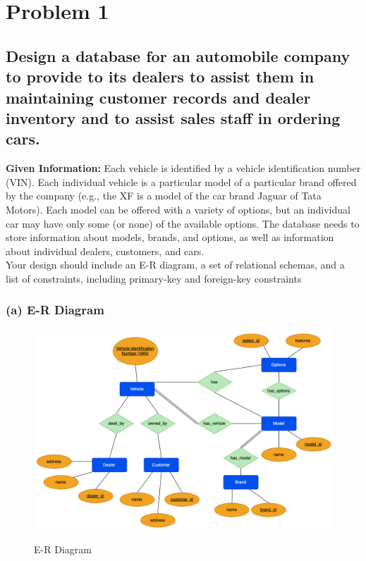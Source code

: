 \documentclass[12pt]{article}
\begin{document}
\begin{titlingpage}
\maketitle
\end{titlingpage}

\newpage

\section{Problem 1}

\subsection*{Design a database for an automobile company to provide to its dealers to assist them in maintaining customer records and dealer inventory and to assist sales staff in ordering cars.} 
\textbf{Given Information:} Each vehicle is identified by a vehicle identification number (VIN). Each individual vehicle is a particular model of a particular brand offered by the company (e.g., the XF is a model of the car brand Jaguar of Tata Motors). Each model can be offered with a variety of options, but an individual car may have only some (or none) of the available options. The database needs to store information about models, brands, and options, as well as information about individual dealers, customers, and cars. 
\\
Your design should include an E-R diagram, a set of relational schemas, and a 
list of constraints, including primary-key and foreign-key constraints

\subsubsection*{(a) E-R Diagram}

\begin{figure}[!hbt]
    \centering
    \includegraphics[scale=0.62]{screenshots/q1_screenshot.png}
    \label{fig:my_label1}
    \caption{E-R Diagram}
\end{figure}
\end{document}
